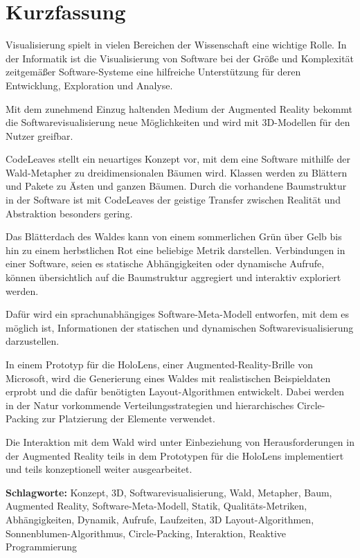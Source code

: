 \chapter*{Kurzfassung}
\thispagestyle{empty}

Visualisierung spielt in vielen Bereichen der Wissenschaft eine wichtige Rolle. In der Informatik ist die Visualisierung von Software bei der Größe und Komplexität zeitgemäßer Software-Systeme eine hilfreiche Unterstützung für deren Entwicklung, Exploration und Analyse.

Mit dem zunehmend Einzug haltenden Medium der Augmented Reality bekommt die Softwarevisualisierung neue Möglichkeiten und wird mit 3D-Modellen für den Nutzer greifbar.

CodeLeaves stellt ein neuartiges Konzept vor, mit dem eine Software mithilfe der Wald-Metapher zu dreidimensionalen Bäumen wird. Klassen werden zu Blättern und Pakete zu Ästen und ganzen Bäumen. Durch die vorhandene Baumstruktur in der Software ist mit CodeLeaves der geistige Transfer zwischen Realität und Abstraktion besonders gering.

Das Blätterdach des Waldes kann von einem sommerlichen Grün über Gelb bis hin zu einem herbstlichen Rot eine beliebige Metrik darstellen. Verbindungen in einer Software, seien es statische Abhängigkeiten oder dynamische Aufrufe, können übersichtlich auf die Baumstruktur aggregiert und interaktiv exploriert werden.

Dafür wird ein sprachunabhängiges Software-Meta-Modell entworfen, mit dem es möglich ist, Informationen der statischen und dynamischen Softwarevisualisierung darzustellen.

In einem Prototyp für die HoloLens, einer Augmented-Reality-Brille von Microsoft, wird die Generierung eines Waldes mit realistischen Beispieldaten erprobt und die dafür benötigten Layout-Algorithmen entwickelt. Dabei werden in der Natur vorkommende Verteilungsstrategien und hierarchisches Circle-Packing zur Platzierung der Elemente verwendet.

Die Interaktion mit dem Wald wird unter Einbeziehung von Herausforderungen in der Augmented Reality teils in dem Prototypen für die HoloLens implementiert und teils konzeptionell weiter ausgearbeitet.

\bigskip
\noindent \textbf{Schlagworte:} Konzept, 3D, Softwarevisualisierung, Wald, Metapher, Baum, Augmented Reality, Software-Meta-Modell, Statik, Qualitäts-Metriken, Abhängigkeiten, Dynamik, Aufrufe, Laufzeiten, 3D Layout-Algorithmen, Sonnenblumen-Algorithmus, Circle-Packing, Interaktion, Reaktive Programmierung
